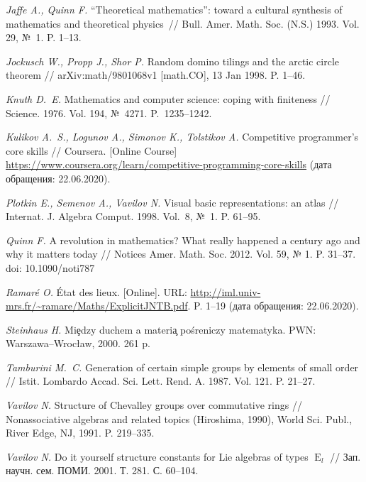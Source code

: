 \documentclass[intlimits,twoside,a4paper,11pt]{article}
\def\E{\operatorname{E}}
\begin{document}
\begin{thebibliography}{99}
{	 {\it Jaffe A., Quinn F.\/} ``Theoretical mathematics'': toward a cultural 
	synthesis of mathematics and theoretical physics~// Bull. Amer. Math. Soc. (N.S.) 1993.
	Vol. 29, №~1. P. 1--13.
	
	 {\it Jockusch W., Propp J., Shor P.}
	Random domino tilings and the arctic circle theorem // 
	arXiv:math/9801068v1 [math.CO], 13 Jan 1998. P. 1--46. 
	
	 {\it Knuth D.~E.\/} Mathematics and computer science: coping with 
	finiteness // Science. 1976. Vol. 194, №~4271. P.~1235--1242.
	
	 {\it Kulikov A.~S., Logunov A., Simonov K., Tolstikov A.\/}
	Competitive programmer's core skills // Coursera. [Online Course]
	\url{https://www.coursera.org/learn/competitive-programming-core-skills} (дата обращения: 22.06.2020).
	
	 {\it Plotkin E., Semenov A., Vavilov N.\/} Visual basic representations: 
	an atlas // Internat. J. Algebra Comput. 1998. Vol.~8, №~1. P. 61--95.
	
	 {\it Quinn F.} A revolution in mathematics? What really happened 
	a century ago and why it matters today // Notices Amer. Math. Soc. 2012. Vol. 59, 
	№ 1. P. 31--37. doi: 10.1090/noti787
	
	 {\it Ramar\'e O.\/} \'Etat des lieux. [Online]. URL:
	\url{http://iml.univ-mrs.fr/~ramare/Maths/ExplicitJNTB.pdf}. P. 1--19 (дата обращения: 22.06.2020).
	
	
	 {\it Steinhaus H.\/} Mi\c{e}dzy duchem a materi\c{a} po\'sreniczy 
	matematyka. PWN: Warszawa--Wroc\l{}aw, 2000. 261 p.
	
	 {\it Tamburini M.~C.\/} Generation of certain simple groups by elements 
	of small order // Istit. Lombardo Accad. Sci. Lett. Rend. A. 1987. Vol. 121. P. 21--27.
	
 {\it Vavilov N.\/} Structure of Chevalley groups over commutative rings //
Nonassociative algebras and related topics (Hiroshima, 1990), World Sci. Publ., 
River Edge, NJ, 1991. P. 219--335. 
	
	 {\it Vavilov N.\/} Do it yourself structure constants for Lie algebras of types 
	$\E_l$ // Зап. научн. сем. ПОМИ. 2001. Т. 281. С. 60--104. 
	
}
\end{thebibliography}
\end{document}
